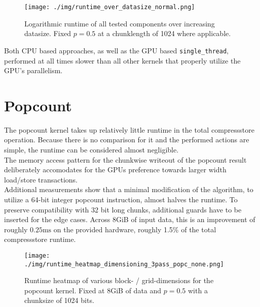 \documentclass{tudscrreprt}
\begin{document}
		\begin{figure}[!ht]
			\centering
			\texttt{[image: ./img/runtime\_over\_datasize\_normal.png]}
			\caption{\label{fig:runtime_over_datasize_normal}Logarithmic runtime of all tested components over increasing datasize. Fixed $p=0.5$ at a chunklength of 1024 where applicable.}
		\end{figure}
	
		Both CPU based approaches, as well as the GPU based \texttt{single\_thread}, performed at all times slower than all other kernels that properly utilize the GPU's parallelism. \\
	
		\section{Popcount}
			\label{sec:evaluation_popcount}
			The popcount kernel takes up relatively little runtime in the total compressstore operation. Because there is no comparison for it and the performed actions are simple, the runtime can be considered almost negligible. \\
			The memory access pattern for the chunkwise writeout of the popcount result deliberately accomodates for the GPUs preference towards larger width load/store transactions. \\
			
			Additional measurements show that a minimal modification of the algorithm, to utilize a 64-bit integer popcount instruction, almost halves the runtime. To preserve compatibility with 32 bit long chunks, additional guards have to be inserted for the edge cases. Across 8GiB of input data, this is an improvement of roughly $0.25\text{ms}$ on the provided hardware, roughly 1.5\% of the total compressstore runtime. \\
			
			\begin{figure}[!ht]
				\centering
				\texttt{[image: ./img/runtime\_heatmap\_dimensioning\_3pass\_popc\_none.png]}
				\caption{\label{fig:runtime_heatmap_dimensioning_3pass_popc_none}Runtime heatmap of various block- / grid-dimensions for the popcount kernel. Fixed at 8GiB of data and $p=0.5$ with a chunksize of 1024 bits.}
			\end{figure}
			
\end{document}
